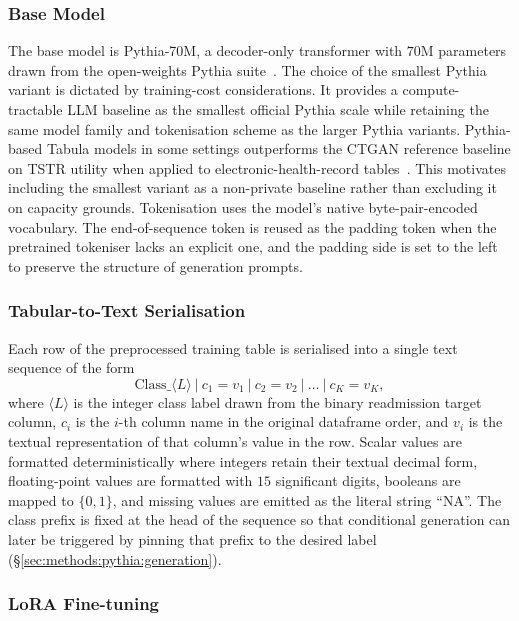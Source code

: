 \subsubsection{Base Model}
\label{sec:methods:pythia:base}

The base model is Pythia-70M, a decoder-only transformer with $70$M
parameters drawn from the open-weights Pythia
suite~\cite{Biderman2023Pythia}. The choice of the smallest Pythia
variant is dictated by training-cost considerations. It provides a compute-tractable 
LLM baseline as the smallest official Pythia scale while
retaining the same model family and tokenisation scheme as the larger
Pythia variants. Pythia-based Tabula
models in some settings outperforms the CTGAN
reference baseline on TSTR utility when
applied to electronic-health-record tables~\cite{Miletic2024}. 
This motivates including the smallest variant as a
non-private baseline rather than excluding it on capacity grounds.
Tokenisation uses the model's native byte-pair-encoded vocabulary. The
end-of-sequence token is reused as the padding token when the
pretrained tokeniser lacks an explicit one, and the padding side is set
to the left to preserve the structure of generation prompts.

\subsubsection{Tabular-to-Text Serialisation}
\label{sec:methods:pythia:serialisation}

Each row of the preprocessed training table is serialised into a single
text sequence of the form
\begin{equation*}
  \mathrm{Class}\_\langle L\rangle ~|~ c_1 = v_1 ~|~ c_2 = v_2 ~|~ \dots ~|~ c_K = v_K,
\end{equation*}
where $\langle L \rangle$ is the integer class label drawn from the
binary readmission target column, $c_i$ is the $i$-th column name in
the original dataframe order, and $v_i$ is the textual representation
of that column's value in the row. Scalar values are formatted
deterministically where integers retain their textual decimal form,
floating-point values are formatted with $15$ significant digits,
booleans are mapped to $\{0, 1\}$, and missing values are emitted as
the literal string ``NA''. The class prefix is fixed at the head of
the sequence so that conditional generation can later be triggered by
pinning that prefix to the desired label
(\S\ref{sec:methods:pythia:generation}).

\subsubsection{LoRA Fine-tuning}
\label{sec:methods:pythia:lora}

